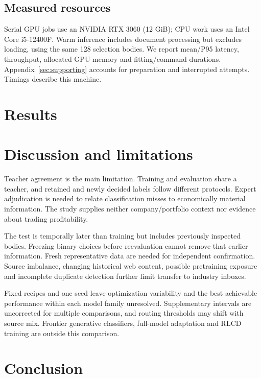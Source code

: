 \documentclass[11pt,a4paper]{article}
\begin{document}
\subsection{Measured resources}
Serial GPU jobs use an NVIDIA RTX 3060 (12 GiB); CPU work uses an Intel
Core i5-12400F. Warm inference includes document processing but excludes loading,
using the same 128 selection bodies. We report mean/P95 latency, throughput,
allocated GPU memory and fitting/command durations. Appendix~\ref{sec:supporting}
accounts for preparation and interrupted attempts. Timings describe this machine.

\FloatBarrier
\section{Results}
\suppressfloats[t]
\label{sec:results}


\section{Discussion and limitations}


Teacher agreement is the main limitation. Training and evaluation share a teacher,
and retained and newly decided labels follow different protocols. Expert
adjudication is needed to relate classification misses to economically material
information. The study supplies neither company/portfolio context nor evidence
about trading profitability.

The test is temporally later than training but includes previously inspected
bodies. Freezing binary choices before reevaluation cannot remove that earlier
information. Fresh representative data are needed for independent confirmation.
Source imbalance, changing historical web content, possible pretraining exposure
and incomplete duplicate detection further limit transfer to industry inboxes.

Fixed recipes and one seed leave optimization variability and the best achievable
performance within each model family unresolved. Supplementary intervals are
uncorrected for multiple comparisons, and routing thresholds may shift with
source mix. Frontier generative classifiers, full-model adaptation and RLCD
training are outside this comparison.

\section{Conclusion}

\end{document}
